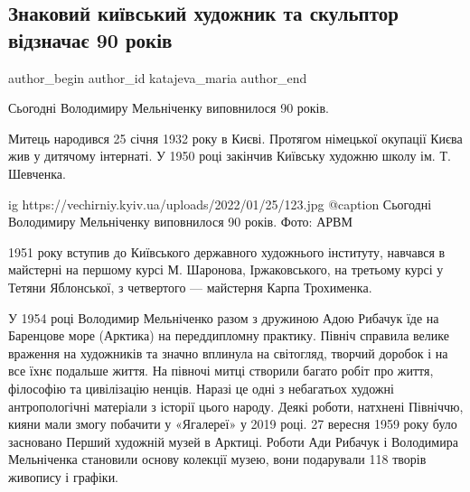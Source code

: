  
 
 
 
 
 
\subsection{Знаковий київський художник та скульптор відзначає 90 років}
\label{sec:25_01_2022.stz.kiev.vecherka.1.melnichenko_hudozhnik}
 
\ifcmt
 author_begin
   author_id katajeva_maria
 author_end
\fi

\begin{zznagolos}
Сьогодні Володимиру Мельніченку виповнилося 90 років.
\end{zznagolos}

Митець народився 25 січня 1932 року в Києві. Протягом німецької окупації Києва
жив у дитячому інтернаті. У 1950 році закінчив Київську художню школу ім. Т.
Шевченка.

\ifcmt
  ig https://vechirniy.kyiv.ua/uploads/2022/01/25/123.jpg
	@caption Сьогодні Володимиру Мельніченку виповнилося 90 років. Фото: АРВМ
\fi

1951 року вступив до Київського державного художнього інституту, навчався в
майстерні на першому курсі М. Шаронова, Іржаковського, на третьому курсі у
Тетяни Яблонської, з четвертого — майстерня Карпа Трохименка.

У 1954 році Володимир Мельніченко разом з дружиною Адою Рибачук їде на
Баренцове море (Арктика) на переддипломну практику. Північ справила велике
враження на художників та значно вплинула на світогляд, творчий доробок і на
все їхнє подальше життя. На півночі митці створили багато робіт про життя,
філософію та цивілізацію ненців. Наразі це одні з небагатьох художні
антропологічні матеріали з історії цього народу. Деякі роботи, натхнені
Північчю, кияни мали змогу побачити у «Ягалереї» у 2019 році. 27 вересня 1959
року було засновано Перший художній музей в Арктиці. Роботи Ади Рибачук і
Володимира Мельніченка становили основу колекції музею, вони подарували 118
творів живопису і графіки.

